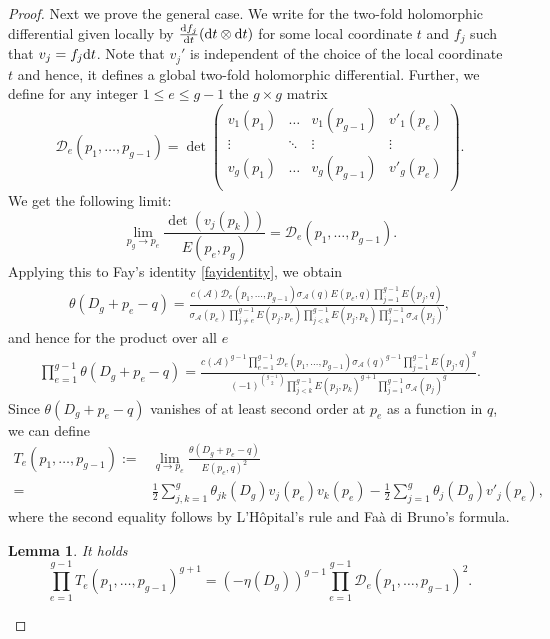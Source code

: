 \documentclass[10pt,a4paper]{amsart}
\numberwithin{equation}{section}
\newtheorem{Lemma}[Theorem]{Lemma}
\begin{document}
\begin{proof}
	Next we prove the general case. We write  for the two-fold holomorphic differential given locally by $\frac{{\rm d}f_j}{{\rm d}t}({\rm d}t\otimes {\rm d}t)$ for some local coordinate $t$ and $f_j$ such that $v_j=f_j{\rm d}t$. Note that $v_j'$ is independent of the choice of the local coordinate $t$ and hence, it defines a global two-fold holomorphic differential.
	Further, we define for any integer $1\le e\le g-1$ the $g\times g$ matrix
	\[\mathscr{D}_{e}(p_1,\dots,p_{g-1})=\det\begin{pmatrix}
		v_1(p_1)&\dots&v_1(p_{g-1})&v'_1(p_{e})\\
		\vdots&\ddots &\vdots&\vdots\\
		v_g(p_1)&\dots&v_g(p_{g-1})&v'_g(p_{e})\\
	\end{pmatrix}.\]
	We get the following limit:
	\[\lim_{p_g\to p_e}\frac{\det(v_j(p_k))}{E(p_e,p_g)}=\mathscr{D}_e(p_1,\dots,p_{g-1}).\]
	Applying this to Fay's identity \eqref{fayidentity}, we obtain
	\begin{align}\label{equ_theta-dg-pe}
		\theta(D_g+p_e-q)=\frac{c(\mathcal{A}) \mathscr{D}_e(p_1,\dots,p_{g-1})\sigma_{\mathcal{A}}(q) E(p_e,q)\prod_{j=1}^{g-1}E(p_j,q)}{\sigma_{\mathcal{A}}(p_e)\prod_{j\neq e}^{g-1}E(p_j,p_e)\prod_{j<k}^{g-1}E(p_j,p_k)\prod_{j=1}^{g-1}\sigma_{\mathcal{A}}(p_j)},
	\end{align}
	and hence for the product over all $e$
	\begin{align}\label{equ_theta-dg-pe2} \prod_{e=1}^{g-1}\theta(D_g+p_e-q)=\frac{c(\mathcal{A})^{g-1}\prod_{e=1}^{g-1}\mathscr{D}_e(p_1,\dots,p_{g-1})\sigma_{\mathcal{A}}(q)^{g-1}\prod_{j=1}^{g-1}E(p_j,q)^g}{(-1)^{\binom{g-1}{2}}\prod_{j<k}^{g-1}E(p_j,p_k)^{g+1}\prod_{j=1}^{g-1}\sigma_{\mathcal{A}}(p_j)^g}.
	\end{align}
	Since $\theta(D_g+p_e-q)$ vanishes of at least second order at $p_e$ as a function in $q$, we can define
	\begin{align}
		T_e(p_1,\dots,p_{g-1}):={}&\lim_{q\to p_e}\frac{\theta(D_g+p_e-q)}{E(p_e,q)^2} \nonumber\\
		={} &\frac{1}{2}\sum_{j,k=1}^g\theta_{jk}(D_g)v_{j}(p_e)v_{k}(p_e)-\frac{1}{2}\sum_{j=1}^g\theta_j(D_g)v'_{j}(p_e),\label{formulaTe}
	\end{align}
	where the second equality follows by L'H\^opital's rule and Fa\`a di Bruno's formula.
	\begin{Lemma}
		It holds
		\[\prod_{e=1}^{g-1}T_e(p_1,\dots,p_{g-1})^{g+1}=(-\eta(D_g))^{g-1}\prod_{e=1}^{g-1}\mathscr{D}_e(p_1,\dots,p_{g-1})^2.\]

\end{Lemma}
\end{proof}
\end{document}
